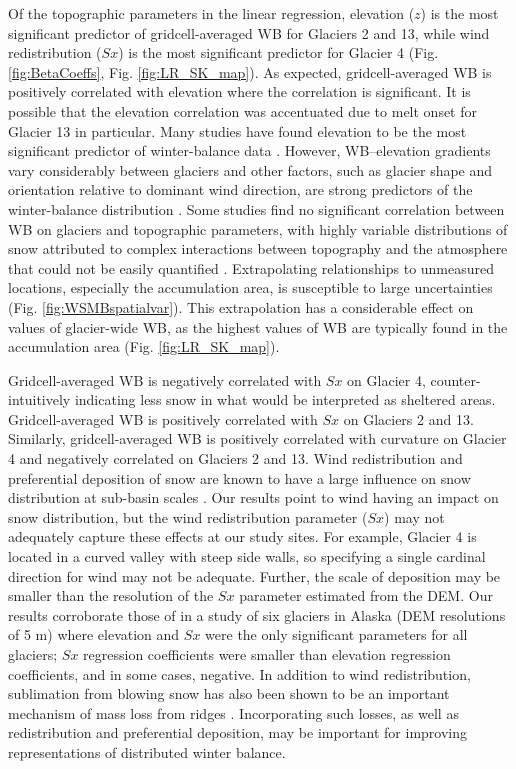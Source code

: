 \documentclass[review,oneside, letterpaper]{igs}
\begin{document}
Of the topographic parameters in the linear regression, elevation ($z$) is the most significant predictor of gridcell-averaged WB for Glaciers 2 and 13, while wind redistribution ($Sx$) is the most significant predictor for Glacier 4 (Fig. \ref{fig:BetaCoeffs}, Fig. \ref{fig:LR_SK_map}). As expected, gridcell-averaged WB is positively correlated with elevation where the correlation is significant. It is possible that the elevation correlation was accentuated due to melt onset for Glacier 13 in particular. Many  studies have found elevation to be the most significant predictor of winter-balance data \citep[e.g.][]{Machguth2006, McGrath2015}. However, WB--elevation gradients vary considerably between glaciers \citep[e.g.][]{Winther1998} and other factors, such as glacier shape and orientation relative to dominant wind direction, are strong predictors of the winter-balance distribution \citep{Machguth2006,Grabiec2011}. Some studies find no significant correlation between WB on glaciers and topographic parameters, with highly variable distributions of snow attributed to complex interactions between topography and the atmosphere that could not be easily quantified \citep[e.g.][]{Grabiec2011,Lopez2011}. Extrapolating relationships to unmeasured locations, especially the accumulation area, is susceptible to large uncertainties (Fig. \ref{fig:WSMBspatialvar}). This extrapolation has a considerable effect on values of glacier-wide WB, as the highest values of WB are typically found in the accumulation area  (Fig. \ref{fig:LR_SK_map}). 

Gridcell-averaged WB is negatively correlated with $Sx$ on Glacier 4, counter-intuitively indicating less snow in what would be interpreted as sheltered areas. Gridcell-averaged WB is positively correlated with $Sx$ on Glaciers 2 and 13. Similarly, gridcell-averaged WB is positively correlated with curvature on Glacier 4 and negatively correlated on Glaciers 2 and 13. Wind redistribution and preferential deposition of snow are known to have a large influence on snow distribution at sub-basin scales \citep[e.g.][]{Dadic2010, Winstral2013,Gerber2017}. Our results point to wind having an impact on snow distribution, but the wind redistribution parameter ($Sx$) may not adequately capture these effects at our study sites. For example, Glacier 4 is located in a curved valley with steep side walls, so specifying a single cardinal direction for wind may not be adequate. Further, the scale of deposition may be smaller than the resolution of the $Sx$ parameter estimated from the DEM. Our results corroborate those of \cite{McGrath2015} in a study of six glaciers in Alaska (DEM resolutions of 5 m) where elevation and $Sx$ were the only significant parameters for all glaciers; $Sx$ regression coefficients were smaller than elevation regression coefficients, and in some cases, negative. In addition to wind redistribution, sublimation from blowing snow has also been shown to be an important mechanism of mass loss from ridges  \citep[e.g.][]{Musselman2015}. Incorporating such losses, as well as redistribution and preferential deposition, may be important for improving representations of distributed winter balance. 
\end{document}
